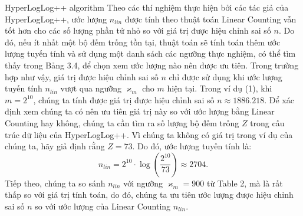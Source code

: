 \documentclass[10pt]{beamer}
\begin{document}
\begin{frame}{HyperLogLog++ algorithm}
  Theo các thí nghiệm thực hiện bởi các tác giả của HyperLogLog++, ước lượng $n_{lin}$ được tính theo thuật toán 
  Linear Counting vẫn tốt hơn cho các số lượng phần tử nhỏ so với giá trị được hiệu chỉnh sai số $n$. Do đó, nếu ít nhất một bộ đếm trống tồn tại, 
  thuật toán sẽ tính toán thêm ước lượng tuyến tính và sử dụng một danh sách các ngưỡng thực nghiệm, có thể tìm thấy trong Bảng 3.4, để chọn xem ước lượng 
  nào nên được ưu tiên. Trong trường hợp như vậy, giá trị được hiệu chỉnh sai số $n$ chỉ được sử dụng khi ước lượng tuyến tính $n_{lin}$ 
  vượt qua ngưỡng $\varkappa_m$ cho $m$ hiện tại.
  Trong ví dụ (1), khi $m = 2^{10}$, chúng ta tính được giá trị được hiệu chỉnh sai số $n \approx 1886.218$. Để xác định xem chúng ta có nên 
  ưu tiên giá trị này so với ước lượng bằng Linear Counting hay không, chúng ta cần tìm ra số lượng bộ đếm trống $Z$ trong cấu trúc dữ liệu của 
  HyperLogLog++. Vì chúng ta không có giá trị trong ví dụ của chúng ta, hãy giả định rằng $Z = 73$.
  Do đó, ước lượng tuyến tính là:
  \[n_{lin} = 2^{10} \cdot \log\left(\frac{2^{10}}{73}\right) \approx 2704.\]
  Tiếp theo, chúng ta so sánh $n_{lin}$ với ngưỡng $\varkappa_m = 900$ từ Table 2, mà là rất thấp so với giá trị tính toán, do đó, 
  chúng ta ưu tiên ước lượng được hiệu chỉnh sai số $n$ so với ước lượng của Linear Counting $n_{lin}$.
\end{frame}
\end{document}
